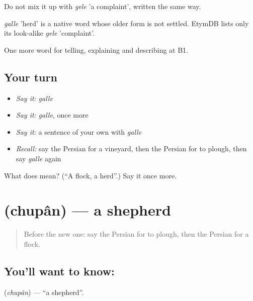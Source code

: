 Do not mix it up with \emph{gele} 'a complaint', written the same way.

\begin{cousinweb}
\emph{galle} 'herd' is a native word whose older form is not settled. EtymDB lists only its look-alike \emph{gele} 'complaint'.
\end{cousinweb}

\begin{grammarlens}[title={What you've built}]
One more word for telling, explaining and describing at B1.
\end{grammarlens}

\subsection*{Your turn}
\begin{itemize}
\raggedright
  \item \emph{Say it:} \emph{galle}
  \item \emph{Say it:} \emph{galle}, once more
  \item \emph{Say it:} a sentence of your own with \emph{galle}
  \item \emph{Recall:} say the Persian for a vineyard, then the Persian for to plough, then say \emph{galle} again
\end{itemize}

\begin{tcolorbox}[breakable,colback=teal!4,colframe=teal!35!black,title={Before you move on}]
What does  mean? (\textquotedblleft{}A flock, a herd\textquotedblright{}.) Say it once more.
\end{tcolorbox}
\section[\texorpdfstring{\fa{چوپان} (chupân)}{چوپان (chupân)}]{ (chupân) — a shepherd}

\label{lesson:FA-C466-chupan}



\begin{quote}
Before the new one: say the Persian for to plough, then the Persian for a flock.
\end{quote}

\subsection*{You'll want to know: }
\textbf{} (\emph{chupân}) — \textquotedblleft{}a shepherd\textquotedblright{}.


